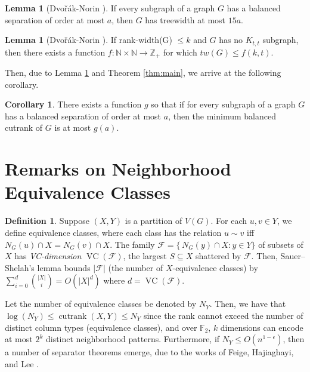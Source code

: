 \documentclass{article}
\theoremstyle{definition}
\newtheorem{lemma}[theorem]{Lemma}
\newtheorem{definition}{Definition}[section]
\newtheorem{corollary}[theorem]{Corollary}
\begin{document}
\begin{lemma}[Dvořák-Norin \cite{Dvorak_Norin_2018}] If every subgraph of a graph $G$ has a balanced
separation of order at most $a$, then $G$ has treewidth at most $15a$.
\end{lemma}

\begin{lemma}[Dvořák-Norin \cite{Dvorak_Norin_2018}]\label{lemma: dvorak-norin rankwidth treewidth} If rank-width(G) $\leq k$ and $G$ has no $K_{t,t}$ subgraph, then there exists a function $f:\mathbb{N}\times\mathbb{N}\to\mathbb{Z}_+$ for which $tw(G) \leq f(k, t)$.
\end{lemma}

Then, due to Lemma \ref{lemma: dvorak-norin rankwidth treewidth} and Theorem \ref{thm:main}, we arrive at the following corollary.


\begin{corollary} There exists a function $g$ so that if for every subgraph of a graph $G$ has a balanced separation of order at most $a$, then the minimum balanced cutrank of $G$ is at most $g(a)$. \\
\end{corollary}


\section{Remarks on Neighborhood Equivalence Classes}
\label{sec: equivalence class neighborhood}  

\begin{definition}
    Suppose $(X, Y)$ is a partition of $V(G)$. For each $u,v\in Y$, we define equivalence classes, where each class has the relation $u\sim v$ iff $N_G(u)\cap X = N_G(v) \cap X$. The family $\mathcal F=\{\,N_G(y)\cap X : y\in Y\}$ of subsets of $X$ has \emph{VC-dimension} $\operatorname{VC}(\mathcal F)$, the largest $S\subseteq X$ shattered by $\mathcal F$.  
Then, Sauer–Shelah's lemma \cite{SAUER1972145,pjm1102968432} bounds $|\mathcal F|$ (the number of $X$-equivalence classes) by $\sum_{i=0}^{d}\binom{|X|}{i}=O(|X|^{d})$ where $d=\operatorname{VC}(\mathcal F)$.
\end{definition}
Let the number of equivalence classes be denoted by $N_Y$. Then, we have that $\log(N_Y) \leq \operatorname{cutrank}(X,Y) \leq {N_Y}$ since the rank cannot exceed the number of distinct column types (equivalence classes), and over $\mathbb{F}_2$, $k$ dimensions can encode at most $2^k$ distinct neighborhood patterns. Furthermore, if $N_Y \leq O(n^{1-\epsilon})$, then a number of separator theorems emerge, due to the works of Feige, Hajiaghayi, and Lee  \cite{Feige_Hajiaghayi_Lee_2008}. 
 
\end{document}
